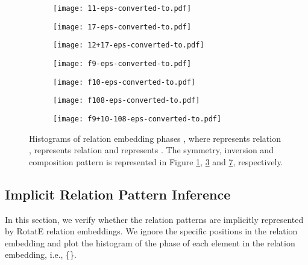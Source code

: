\documentclass{article} \usepackage{iclr2019_conference,times}
\def\method{RotatE}
\begin{document}
\begin{figure}[t]
\centering
\begin{subfigure}{0.32\textwidth}
  \centering
  \texttt{[image: 11-eps-converted-to.pdf]}
  \caption{}
  \label{fig:sim}
\end{subfigure}
\begin{subfigure}{0.32\textwidth}
  \centering
  \texttt{[image: 17-eps-converted-to.pdf]}
  \caption{}
  \label{fig:hyper}
\end{subfigure}
\begin{subfigure}{0.32\textwidth}
  \centering
  \texttt{[image: 12+17-eps-converted-to.pdf]}
  \caption{}
  \label{fig:hyper+hypo}
\end{subfigure}
\begin{subfigure}{0.24\textwidth}
  \centering
  \texttt{[image: f9-eps-converted-to.pdf]}
  \caption{}
  \label{fig:nom}
\end{subfigure}
\begin{subfigure}{0.24\textwidth}
  \centering
  \texttt{[image: f10-eps-converted-to.pdf]}
  \caption{}
  \label{fig:win}
\end{subfigure}
\begin{subfigure}{0.24\textwidth}
  \centering
  \texttt{[image: f108-eps-converted-to.pdf]}
  \caption{}
  \label{fig:nom2}
\end{subfigure}
\begin{subfigure}{0.24\textwidth}
  \centering
  \texttt{[image: f9+10-108-eps-converted-to.pdf]}
  \caption{}
  \label{fig:nomw}
\end{subfigure}
\vspace{-2.0px}
\caption{Histograms of relation embedding phases  , where  represents relation , 
 represents relation  and  represents . The symmetry, inversion and composition pattern is represented in Figure \ref{fig:sim}, \ref{fig:hyper+hypo} and \ref{fig:nomw}, respectively.}
\label{fig:verify}
\end{figure}

\subsection{Implicit Relation Pattern Inference}

In this section, we verify whether the relation patterns are implicitly represented by \method{} relation embeddings. We ignore the specific positions in the relation embedding  and plot the histogram of the phase of each element in the relation embedding, i.e., \{\}.
\end{document}
